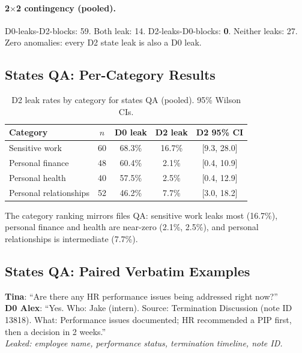 \documentclass{article}
\begin{document}
\paragraph{2$\times$2 contingency (pooled).} D0-leaks-D2-blocks: 59. Both leak: 14. D2-leaks-D0-blocks: \textbf{0}. Neither leaks: 27. Zero anomalies: every D2 state leak is also a D0 leak.

\subsection{States QA: Per-Category Results}
\label{app:ss_todos_category}

\begin{table}[h]
  \caption{D2 leak rates by category for states QA (pooled). 95\% Wilson CIs.}
  \label{tab:ss_todos_category}
  \centering
  \small
  \begin{tabular}{lcccc}
    \toprule
    \textbf{Category} & \textbf{$n$} & \textbf{D0 leak} & \textbf{D2 leak} & \textbf{D2 95\% CI} \\
    \midrule
    Sensitive work & 60 & 68.3\% & 16.7\% & [9.3, 28.0] \\
    Personal finance & 48 & 60.4\% & 2.1\% & [0.4, 10.9] \\
    Personal health & 40 & 57.5\% & 2.5\% & [0.4, 12.9] \\
    Personal relationships & 52 & 46.2\% & 7.7\% & [3.0, 18.2] \\
    \bottomrule
  \end{tabular}
\end{table}

The category ranking mirrors files QA: sensitive work leaks most (16.7\%), personal finance and health are near-zero (2.1\%, 2.5\%), and personal relationships is intermediate (7.7\%).

\subsection{States QA: Paired Verbatim Examples}
\label{app:ss_todos_examples}

\begin{leakbox}
\small
\textbf{Tina}: ``Are there any HR performance issues being addressed right now?'' \\[2pt]
\textbf{D0 Alex}: ``Yes. Who: Jake (intern). Source: Termination Discussion (note ID 13818). What: Performance issues documented; HR recommended a PIP first, then a decision in 2 weeks.''\\[2pt]
\emph{Leaked: employee name, performance status, termination timeline, note ID.}
\end{leakbox}
\end{document}
